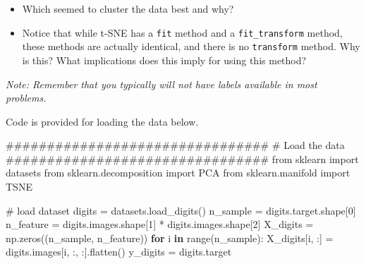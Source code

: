 \documentclass[
  letterpaper,
  DIV=11,
  numbers=noendperiod]{scrartcl}
\newenvironment{Shaded}{\begin{snugshade}}{\end{snugshade}}
\newcommand{\BuiltInTok}[1]{\textcolor[rgb]{0.00,0.23,0.31}{#1}}
\newcommand{\CommentTok}[1]{\textcolor[rgb]{0.37,0.37,0.37}{#1}}
\newcommand{\ControlFlowTok}[1]{\textcolor[rgb]{0.00,0.23,0.31}{\textbf{#1}}}
\newcommand{\DecValTok}[1]{\textcolor[rgb]{0.68,0.00,0.00}{#1}}
\newcommand{\ImportTok}[1]{\textcolor[rgb]{0.00,0.46,0.62}{#1}}
\newcommand{\KeywordTok}[1]{\textcolor[rgb]{0.00,0.23,0.31}{\textbf{#1}}}
\newcommand{\NormalTok}[1]{\textcolor[rgb]{0.00,0.23,0.31}{#1}}
\newcommand{\OperatorTok}[1]{\textcolor[rgb]{0.37,0.37,0.37}{#1}}
\providecommand{\tightlist}{%
  \setlength{\itemsep}{0pt}\setlength{\parskip}{0pt}}\usepackage{longtable,booktabs,array}
\begin{document}
\begin{itemize}
\tightlist
\item
  Which seemed to cluster the data best and why?
\item
  Notice that while t-SNE has a \texttt{fit} method and a
  \texttt{fit\_transform} method, these methods are actually identical,
  and there is no \texttt{transform} method. Why is this? What
  implications does this imply for using this method?
\end{itemize}

\emph{Note: Remember that you typically will not have labels available
in most problems.}

Code is provided for loading the data below.

\begin{Shaded}
\begin{Highlighting}[]
\CommentTok{\#\#\#\#\#\#\#\#\#\#\#\#\#\#\#\#\#\#\#\#\#\#\#\#\#\#\#\#\#\#\#\#}
\CommentTok{\# Load the data}
\CommentTok{\#\#\#\#\#\#\#\#\#\#\#\#\#\#\#\#\#\#\#\#\#\#\#\#\#\#\#\#\#\#\#\#}
\ImportTok{from}\NormalTok{ sklearn }\ImportTok{import}\NormalTok{ datasets}
\ImportTok{from}\NormalTok{ sklearn.decomposition }\ImportTok{import}\NormalTok{ PCA}
\ImportTok{from}\NormalTok{ sklearn.manifold }\ImportTok{import}\NormalTok{ TSNE}

\CommentTok{\# load dataset}
\NormalTok{digits }\OperatorTok{=}\NormalTok{ datasets.load\_digits()}
\NormalTok{n\_sample }\OperatorTok{=}\NormalTok{ digits.target.shape[}\DecValTok{0}\NormalTok{]}
\NormalTok{n\_feature }\OperatorTok{=}\NormalTok{ digits.images.shape[}\DecValTok{1}\NormalTok{] }\OperatorTok{*}\NormalTok{ digits.images.shape[}\DecValTok{2}\NormalTok{]}
\NormalTok{X\_digits }\OperatorTok{=}\NormalTok{ np.zeros((n\_sample, n\_feature))}
\ControlFlowTok{for}\NormalTok{ i }\KeywordTok{in} \BuiltInTok{range}\NormalTok{(n\_sample):}
\NormalTok{    X\_digits[i, :] }\OperatorTok{=}\NormalTok{ digits.images[i, :, :].flatten()}
\NormalTok{y\_digits }\OperatorTok{=}\NormalTok{ digits.target}
\end{Highlighting}
\end{Shaded}
\end{document}
